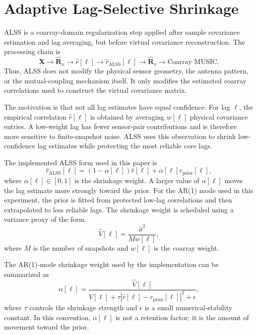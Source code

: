 \documentclass[conference]{IEEEtran}
\begin{document}
\section{Adaptive Lag-Selective Shrinkage}

ALSS is a coarray-domain regularization step applied after sample covariance estimation and lag averaging, but before virtual covariance reconstruction. The processing chain is
\begin{equation}
    \mathbf{X}
    \rightarrow
    \hat{\mathbf{R}}_x
    \rightarrow
    \hat{r}[\ell]
    \rightarrow
    \hat{r}_{\mathrm{ALSS}}[\ell]
    \rightarrow
    \hat{\mathbf{R}}_v
    \rightarrow
    \text{Coarray MUSIC}.
\end{equation}
Thus, ALSS does not modify the physical sensor geometry, the antenna pattern, or the mutual-coupling mechanism itself. It only modifies the estimated coarray correlations used to construct the virtual covariance matrix.

The motivation is that not all lag estimates have equal confidence. For lag $\ell$, the empirical correlation $\hat{r}[\ell]$ is obtained by averaging $w[\ell]$ physical covariance entries. A low-weight lag has fewer sensor-pair contributions and is therefore more sensitive to finite-snapshot noise. ALSS uses this observation to shrink low-confidence lag estimates while protecting the most reliable core lags.

The implemented ALSS form used in this paper is
\begin{equation}
    \hat{r}_{\mathrm{ALSS}}[\ell]
    =
    \left(1-\alpha[\ell]\right)\hat{r}[\ell]
    +
    \alpha[\ell] r_{\mathrm{prior}}[\ell],
\end{equation}
where $\alpha[\ell]\in[0,1]$ is the shrinkage weight. A larger value of $\alpha[\ell]$ moves the lag estimate more strongly toward the prior. For the AR(1) mode used in this experiment, the prior is fitted from protected low-lag correlations and then extrapolated to less reliable lags. The shrinkage weight is scheduled using a variance proxy of the form
\begin{equation}
    \widehat{V}[\ell]
    =
    \frac{\hat{\sigma}^{2}}{M w[\ell]},
\end{equation}
where $M$ is the number of snapshots and $w[\ell]$ is the coarray weight.

The AR(1)-mode shrinkage weight used by the implementation can be summarized as
\begin{equation}
    \alpha[\ell]
    =
    \frac{\widehat{V}[\ell]}
    {\widehat{V}[\ell]
    +
    \tau
    \left|
        \hat{r}[\ell]-r_{\mathrm{prior}}[\ell]
    \right|^2
    +
    \epsilon},
\end{equation}
where $\tau$ controls the shrinkage strength and $\epsilon$ is a small numerical-stability constant. In this convention, $\alpha[\ell]$ is not a retention factor; it is the amount of movement toward the prior.
\end{document}
